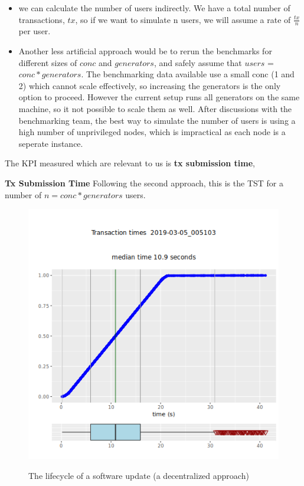 \begin{itemize}

  \item we can calculate the number of users indirectly. We have a total number
of transactions, $tx$, so if we want to simulate n users, we will assume a rate
of $\frac{tx}{n}$ per user.
  \item Another less artificial approach would be to rerun the benchmarks for
different sizes of $conc$ and $generators$, and safely assume that $users$ =
    $conc * generators$. The benchmarking data available use a small conc (1 and
    2) which cannot scale effectively, so increasing the generators is the only
    option to proceed. However the current setup runs all generators on the same
    machine, so it not possible to scale them as well. After discussions with
    the benchmarking team, the best way to simulate the number of users is using
    a high number of unprivileged nodes, which is impractical as each node is
    a seperate instance.

\end{itemize}
The KPI measured which are relevant to us is \textbf{tx submission time},
\begin{description}
  \item \textbf{Tx Submission Time} Following the second approach, this
    is the TST for a number of $n = conc * generators$ users.

\end{description}

\begin{figure}[h!]
    \caption{The lifecycle of a software update (a decentralized approach)}
    \centering
    \includegraphics[width=\textwidth]{figures/tst.png}
    \label{tst}
\end{figure}


